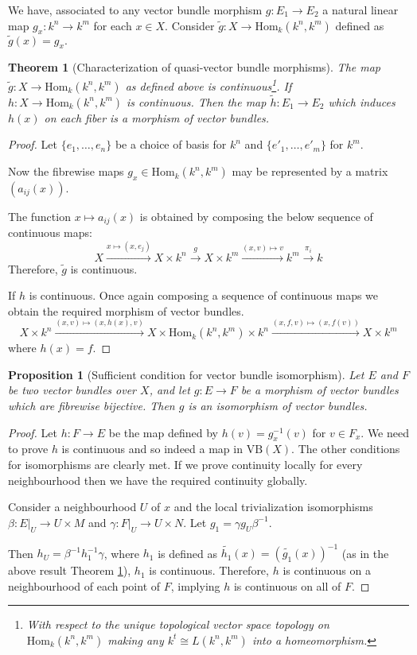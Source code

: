 \documentclass[12pt]{report}
\numberwithin{equation}{section}
\newcommand{\Hom}{{\mathrm{Hom}}}
\newtheorem{theorem}[dummy]{Theorem}
\newtheorem{proposition}[dummy]{Proposition}
\begin{document}
	We have, associated to any vector bundle morphism $g: E_1 \to E_2$ a natural linear map $g_x: k^n \to k^m$ for each \(x \in X\). Consider $\widetilde{g}: X \to \Hom_k(k^n, k^m)$ defined as $\widetilde{g}(x)=g_x.$
	\begin{theorem}[Characterization of quasi-vector bundle morphisms]\label{thtrivialbundlemorphisms}
		The map $\tilde{g}: X \to \text{Hom}_k(k^n, k^m)$ as defined above is continuous\footnote{With respect to the unique topological vector space topology on $\text{Hom}_k(k^n, k^m)$ making any $k^t \cong L(k^n,k^m)$ into a homeomorphism.}. If ${h}: X \to \text{Hom}_k(k^n, k^m)$ is continuous. Then the map $\tilde{h}: E_1 \to E_2$ which induces $h(x)$ on each fiber is a morphism of vector bundles.
	\end{theorem}
	\begin{proof}
		Let $\{e_1, \dots, e_n\}$ be a choice of basis for $k^n$ and $\{e'_1, \dots, e'_m\}$ for $k^m$.  
		
		Now the fibrewise maps ${g}_x \in \text{Hom}_k(k^n, k^m)$ may be represented by a matrix $(a_{ij}(x))$.
		
		The function $x \mapsto a_{ij}(x)$ is obtained by composing the below sequence of continuous maps:
		\[ X \xrightarrow{x \mapsto (x,e_j)} X \times k^n \xrightarrow{g} X \times k^m \xrightarrow{(x,v)\mapsto v} k^m \xrightarrow{\pi_i} k \]
		Therefore, $\tilde{g}$ is continuous.
		
		If $h$ is continuous. Once again composing a sequence of continuous maps we obtain the required morphism of vector bundles.
		\[ X \times k^n \xrightarrow{(x,v)\mapsto (x,h(x),v)} X \times \text{Hom}_k(k^n, k^m) \times k^n \xrightarrow{(x,f,v)\mapsto (x,f(v))} X \times k^m \]
		where $h(x)=f.$
	\end{proof}
	
	\begin{proposition}[Sufficient condition for vector bundle isomorphism]\label{propsciso}
		Let $E$ and $F$ be two vector bundles over $X$, and let $g: E \to F$ be a morphism of vector bundles which are fibrewise bijective. Then \(g\) is an isomorphism of vector bundles.
	\end{proposition}
	
	\begin{proof}
		Let $h: F\to E$ be the map defined by $h(v) = g_x^{-1}(v)$ for $v \in F_x$. We need to prove $h$ is continuous and so indeed a map in $\mathrm{VB}(X)$. The other conditions for isomorphisms are clearly met. If we prove continuity locally for every neighbourhood then we have the required continuity globally.
		
		Consider a neighbourhood $U$ of $x$ and the local trivialization isomorphisms $\beta: E|_U \to U \times M$ and $\gamma: F|_U \to U \times N$. Let $g_1 = \gamma g_U \beta^{-1}$. 
		
		Then $h_U = \beta^{-1} h_1^{-1} \gamma$, where $h_1$ is defined as $\widetilde{h_1}(x) = (\widetilde{g_1}(x))^{-1}$ (as in the above result Theorem \ref{thtrivialbundlemorphisms}), $h_1$ is continuous.  Therefore, $h$ is continuous on a neighbourhood of each point of $F$, implying $h$ is continuous on all of $F$.
	\end{proof}
	
\end{document}

